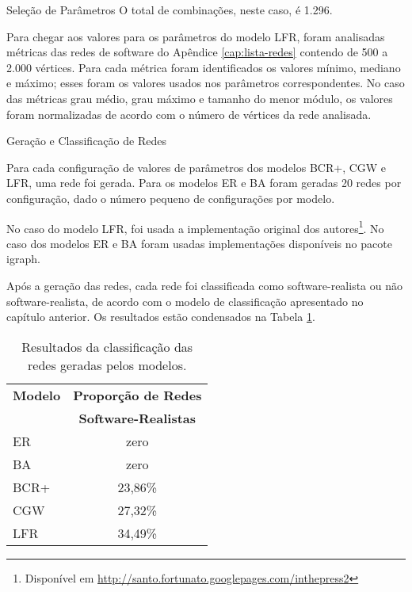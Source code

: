 \begin{section}{Seleção de Parâmetros}
O total de combinações, neste caso, é 1.296.

Para chegar aos valores para os parâmetros do modelo LFR, foram analisadas métricas das redes de software do Apêndice \ref{cap:lista-redes} contendo de 500 a 2.000 vértices. Para cada métrica foram identificados os valores mínimo, mediano e máximo; esses foram os valores usados nos parâmetros correspondentes. No caso das métricas grau médio, grau máximo e tamanho do menor módulo, os valores foram normalizadas de acordo com o número de vértices da rede analisada.


\end{section}

\begin{section}{Geração e Classificação de Redes}
	
	Para cada configuração de valores de parâmetros dos modelos BCR+, CGW e LFR, uma rede foi gerada. Para os modelos ER e BA foram geradas 20 redes por configuração, dado o número pequeno de configurações por modelo. 
	
	No caso do modelo LFR, foi usada a implementação original dos autores\footnote{Disponível em \url{http://santo.fortunato.googlepages.com/inthepress2}}. No caso dos modelos ER e BA foram usadas implementações disponíveis no pacote igraph\cite{igraph}.
	
	Após a geração das redes, cada rede foi classificada como software-realista ou não software-realista, de acordo com o modelo de classificação apresentado no capítulo anterior. Os resultados estão condensados na Tabela \ref{tab:results}.

	

\begin{table}
\caption{Resultados da classificação das redes geradas pelos modelos.}
\centering
\begin{tabular}{|l|c|}
\hline
\textbf{Modelo} & \textbf{Proporção de Redes} \\ & \textbf{Software-Realistas} \\
\hline 
\hline
ER & zero \\ %
\hline
BA & zero \\ %
\hline
BCR+ & 23,86\% \\ %
\hline
CGW  & 27,32\% \\  %
\hline
LFR  & 34,49\% \\ %
\hline
\end{tabular}
\label{tab:results}
\end{table}


\end{section}
